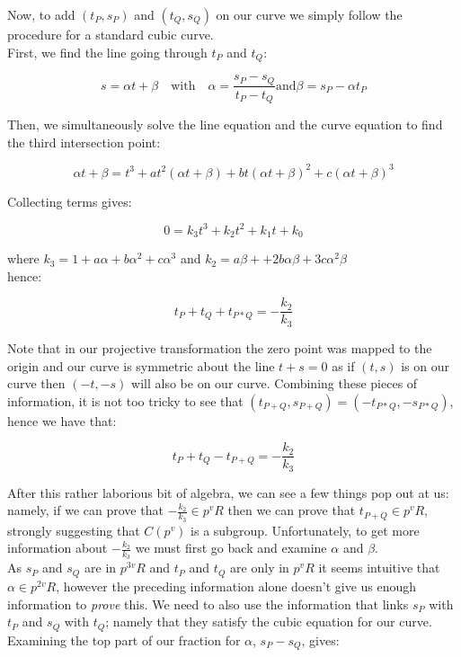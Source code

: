 \documentclass{article}
\begin{document}
Now, to add $(t_P, s_P)$ and $(t_Q, s_Q)$ on our curve we simply follow the procedure for a standard cubic curve.\\

First, we find the line going through $t_P$ and $t_Q$:

\[ s = \alpha t + \beta \quad \text{with} \quad \alpha = \frac{s_P - s_Q}{t_P - t_Q} \text{and} \beta = s_P - \alpha t_P \]

Then, we simultaneously solve the line equation and the curve equation to find the third intersection point:

\[ \alpha t + \beta = t^3 + a t^2 (\alpha t + \beta) + b t (\alpha t + \beta)^2 + c (\alpha t + \beta)^3 \]

Collecting terms gives:

\[ 0 = k_3 t^3 + k_2 t^2 + k_1 t + k_0 \]

where $k_3 = 1 + a \alpha + b \alpha^2 + c \alpha^3$ and $k_2 = a \beta + + 2 b \alpha \beta + 3c \alpha^2 \beta$\\

hence: 

\[ t_P + t_Q + t_{P*Q} = -\frac{k_2}{k_3} \]

Note that in our projective transformation the zero point was mapped to the origin and our curve is symmetric about the line $t + s = 0$ as if $(t, s)$ is on our curve then $(-t, -s)$ will also be on our curve. Combining these pieces of information, it is not too tricky to see that $(t_{P + Q}, s_{P + Q}) = (-t_{P * Q}, -s_{P * Q})$, hence we have that:

\[ t_P + t_Q - t_{P+Q} = -\frac{k_2}{k_3} \]

After this rather laborious bit of algebra, we can see a few things pop out at us: namely, if we can prove that $-\frac{k_2}{k_3} \in p^v R$ then we can prove that $t_{P+Q} \in p^v R$, strongly suggesting that $C(p^v)$ is a subgroup. Unfortunately, to get more information about $-\frac{k_2}{k_3}$ we must first go back and examine $\alpha$ and $\beta$. \\

As $s_P$ and $s_Q$ are in $p^{3v}R$ and $t_P$ and $t_Q$ are only in $p^v R$ it seems intuitive that $\alpha \in p^{2v}R$, however the preceding information alone doesn't give us enough information to \emph{prove} this. We need to also use the information that links $s_P$ with $t_P$ and $s_Q$ with $t_Q$; namely that they satisfy the cubic equation for our curve. Examining the top part of our fraction for $\alpha$, $s_P - s_Q$, gives:
\end{document}
